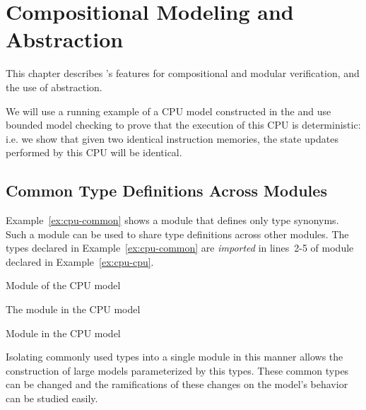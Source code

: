 \chapter{Compositional Modeling and Abstraction}
\label{ch:compositional}

This chapter describes \uclid{}'s features for compositional and modular verification, and the use of abstraction.

We will use a running example of a CPU model constructed in the \uclid{} and use bounded model checking to prove that the execution of this CPU is deterministic: i.e. we show that given two identical instruction memories, the state updates performed by this CPU will be identical.

\section{Common Type Definitions Across Modules}
Example~\ref{ex:cpu-common} shows a module that defines only type synonyms. Such a module can be used to share type definitions across other modules. The types declared in Example~\ref{ex:cpu-common} are \emph{imported} in lines~2-5 of module  declared in Example~\ref{ex:cpu-cpu}.

\label{sec:cpu-model}
\begin{uclidlisting}[htbp]
    
    \caption{Module  of the CPU model}
    \label{ex:cpu-common}
\end{uclidlisting}

\begin{uclidlisting}[htbp]
    
    \caption{The  module in the CPU model}
    \label{ex:cpu-cpu}
\end{uclidlisting}


\begin{uclidlisting}[htbp]
    
    \caption{Module  in the CPU model}
    \label{ex:cpu-main}
\end{uclidlisting}


Isolating commonly used types into a single module in this manner allows the construction of large models parameterized by this types. These common types can be changed and the ramifications of these changes on the model's behavior can be studied easily.

